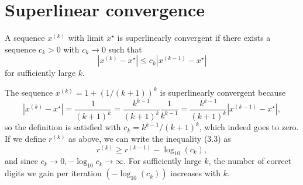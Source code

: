\section{Superlinear convergence}

A sequence $ x^{(k)} $ with limit $ x^{\star} $ is superlinearly convergent if there exists a sequence $ c_{k}>0 $ with $ c_{k} \rightarrow 0 $ such that
$$
\left|x^{(k)}-x^{\star}\right| \leq c_{k}\left|x^{(k-1)}-x^{\star}\right|
$$
for sufficiently large $ k $.

The sequence $ x^{(k)}=1+(1 /(k+1))^{k} $ is superlinearly convergent because
$$
\left|x^{(k)}-x^{\star}\right|=\frac{1}{(k+1)^{k}}=\frac{k^{k-1}}{(k+1)^{k}} \frac{1}{k^{k-1}}=\frac{k^{k-1}}{(k+1)^{k}}\left|x^{(k-1)}-x^{\star}\right|,
$$
so the definition is satisfied with $ c_{k}=k^{k-1} /(k+1)^{k} $, which indeed goes to zero.
If we define $ r^{(k)} $ as above, we can write the inequality (3.3) as
$$
r^{(k)} \geq r^{(k-1)}-\log _{10}\left(c_{k}\right),
$$
and since $ c_{k} \rightarrow 0,-\log _{10} c_{k} \rightarrow \infty $. For sufficiently large $ k $, the number of correct digits we gain per iteration $ \left(-\log _{10}\left(c_{k}\right)\right) $ increases with $ k $.

